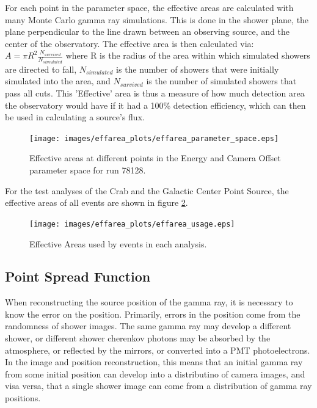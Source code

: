 For each point in the parameter space, the effective areas are calculated with many Monte Carlo gamma ray simulations.
This is done in the shower plane, the plane perpendicular to the line drawn between an observing source, and the center of the observatory.
The effective area is then calculated via:
$A=\pi R^2 \frac{N_{survived}}{N_{simulated}}$
where R is the radius of the area within which simulated showers are directed to fall, $N_{simulated}$ is the number of showers that were initially simulated into the area, and $N_{survived}$ is the number of simulated showers that pass all cuts.
This 'Effective' area is thus a measure of how much detection area the observatory would have if it had a 100\% detection efficiency, which can then be used in calculating a source's flux.

\begin{figure}[ht]
  \begin{center}
    \texttt{[image: images/effarea\_plots/effarea\_parameter\_space.eps]}
    \caption[Effective Area Parameter Space]{Effective areas at different points in the Energy and Camera Offset parameter space for run 78128.}\label{fig:effarea_paramspace}
  \end{center}
\end{figure}

For the test analyses of the Crab and the Galactic Center Point Source, the effective areas of all events are shown in figure \ref{fig:effarea_usage}.

\begin{figure}[ht]
  \begin{center}
    \texttt{[image: images/effarea\_plots/effarea\_usage.eps]}
    \caption[Effective Area Parameter Space]{Effective Areas used by events in each analysis.}\label{fig:effarea_usage}
  \end{center}
\end{figure}

\subsection{Point Spread Function}\label{sec:psf}

When reconstructing the source position of the gamma ray, it is necessary to know the error on the position.
Primarily, errors in the position come from the randomness of shower images.
The same gamma ray may develop a different shower, or different shower cherenkov photons may be absorbed by the atmosphere, or reflected by the mirrors, or converted into a PMT photoelectrons.
In the image and position reconstruction, this means that an initial gamma ray from some initial position can develop into a distributino of camera images, and visa versa, that a single shower image can come from a distribution of gamma ray positions.

